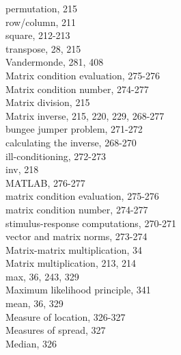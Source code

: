 \documentclass[../main.tex]{subfiles}
\begin{document}
\begin{multicols}{3}
    \hspace*{3mm}permutation, 215\\
    \hspace*{3mm}row/column, 211\\
    \hspace*{3mm}square, 212-213\\
    \hspace*{3mm}transpose, 28, 215\\
    \hspace*{3mm}Vandermonde, 281, 408\\
    Matrix condition evaluation, 275-276\\
    Matrix condition number, 274-277\\
    Matrix division, 215\\
    Matrix inverse, 215, 220, 229, 268-277\\
    \hspace*{3mm}bungee jumper problem, 271-272\\
    \hspace*{3mm}calculating the inverse, 268-270\\
    \hspace*{3mm}ill-conditioning, 272-273\\
    \hspace*{3mm}inv, 218\\
    \hspace*{3mm}MATLAB, 276-277\\
    \hspace*{3mm}matrix condition evaluation, 275-276\\
    \hspace*{3mm}matrix condition number, 274-277\\
    \hspace*{3mm}stimulus-response computations, 270-271\\
    \hspace*{3mm}vector and matrix norms, 273-274\\
    Matrix-matrix multiplication, 34\\
    Matrix multiplication, 213, 214\\
    max, 36, 243, 329\\
    Maximum likelihood principle, 341\\
    mean, 36, 329\\
    Measure of location, 326-327\\
    Measures of spread, 327\\
    Median, 326\\

\end{multicols}
\end{document}
